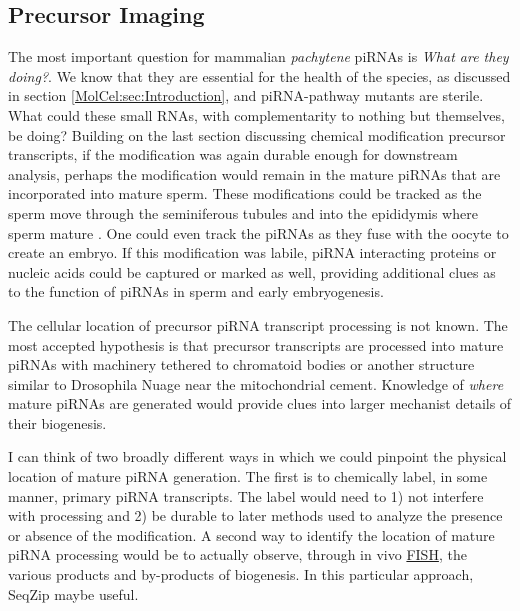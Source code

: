   \subsection{Precursor Imaging}
    \label{Disc:subsec:Imaging of precursors}

    The most important question for mammalian \textit{pachytene} piRNAs is \textit{What are they doing?}. We know that they are essential for the health of the species, as discussed in section \ref{MolCel:sec:Introduction}, and piRNA-pathway mutants are sterile. What could these small RNAs, with complementarity to nothing but themselves, be doing? Building on the last section discussing chemical modification precursor transcripts, if the modification was again durable enough for downstream analysis, perhaps the modification would remain in the mature piRNAs that are incorporated into mature sperm. These modifications could be tracked as the sperm move through the seminiferous tubules and into the epididymis where sperm mature \citep{Jones1999}. One could even track the piRNAs as they fuse with the oocyte to create an embryo. If this modification was labile, piRNA interacting proteins or nucleic acids could be captured or marked as well, providing additional clues as to the function of piRNAs in sperm and early embryogenesis.

    The cellular location of precursor piRNA transcript processing is not known. The most accepted hypothesis is that precursor transcripts are processed into mature piRNAs with machinery tethered to chromatoid bodies \citep{Meikar2011,Meikar2014} or another structure similar to Drosophila Nuage near the mitochondrial cement. Knowledge of \textit{where} mature piRNAs are generated would provide clues into larger mechanist details of their biogenesis. 

    I can think of two broadly different ways in which we could pinpoint the physical location of mature piRNA generation. The first is to chemically label, in some manner, primary piRNA transcripts. The label would need to 1) not interfere with processing and 2) be durable to later methods used to analyze the presence or absence of the modification. A second way to identify the location of mature piRNA processing would be to actually observe, through in vivo \hyperref[hd:abrevs]{FISH}, the various products and by-products of biogenesis. In this particular approach, SeqZip maybe useful.


